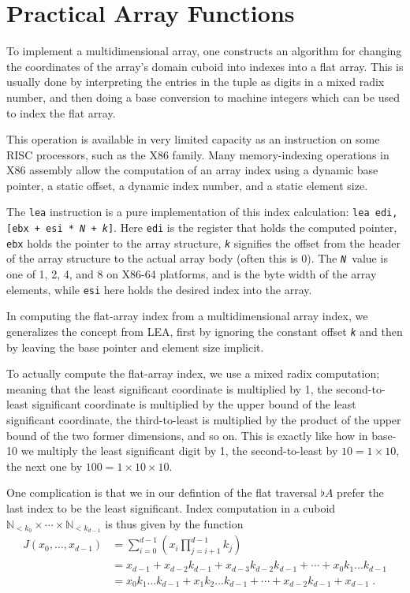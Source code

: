 \documentclass{DIKU-report-variant}
\newcommand\Nat{\mathbb{N}}
\begin{document}
\section{Practical Array Functions}

To implement a multidimensional array, one constructs an algorithm for changing the coordinates
of the array's domain cuboid into indexes into a flat array. This is usually done by interpreting
the entries in the tuple as digits in a mixed radix number, and then doing a base conversion to
machine integers which can be used to index the flat array.

This operation is available in very limited capacity as an instruction on some RISC processors,
such as the X86 family. Many memory-indexing operations in X86 assembly allow the computation of
an array index using a dynamic base pointer, a static offset, a dynamic index number, and a static
element size.

The \texttt{lea} instruction is a pure implementation of this index calculation:
\texttt{lea edi, [ebx + esi * \textit N + \textit k]}. Here \texttt{edi} is the register
that holds the computed pointer, \texttt{ebx} holds the pointer to the array structure,
\texttt{\textit k} signifies the offset from the header of the array structure to the actual
array body (often this is 0). The \texttt{\textit N }value
is one of 1, 2, 4, and 8 on X86-64 platforms, and is the byte width of the array elements, while
\texttt{esi} here holds the desired index into the array.

In computing the flat-array index from a multidimensional array index, we generalizes the concept from LEA,
first by ignoring the constant offset \texttt{\textit k} and then by leaving the base pointer and
element size implicit. 

To actually compute the flat-array index, we use a mixed radix computation; meaning that the least
significant coordinate is multiplied by 1, the second-to-least significant coordinate is multiplied
by the upper bound of the least significant coordinate, the third-to-least is multiplied by the product
of the upper bound of the two former dimensions, and so on. This is exactly like how in base-10 we multiply
the least significant digit by 1, the second-to-least by \(10 = 1\times 10\), the next one by
\(100 = 1\times 10\times 10\). 

One complication is that we in our defintion of the flat traversal \(\flat A\) prefer the last index
to be the least significant. Index computation in a cuboid \(\Nat_{<k_0} \times \cdots \times \Nat_{<k_{d-1}}\) is
thus given by the function
\begin{align*}
  J(x_0, \dots, x_{d-1}) &= \sum_{i=0}^{d-1} \left( x_i \prod_{j=i+1}^{d-1} k_j \right) \\
  &= x_{d-1} + x_{d-2} k_{d-1} + x_{d-3} k_{d-2} k_{d-1} + \cdots + x_0 k_1 \dots k_{d-1} \\
  &= x_0 k_1 \dots k_{d-1} + x_1 k_2 \dots k_{d-1} + \cdots + x_{d-2} k_{d-1} + x_{d-1} \;.
\end{align*}
\end{document}
